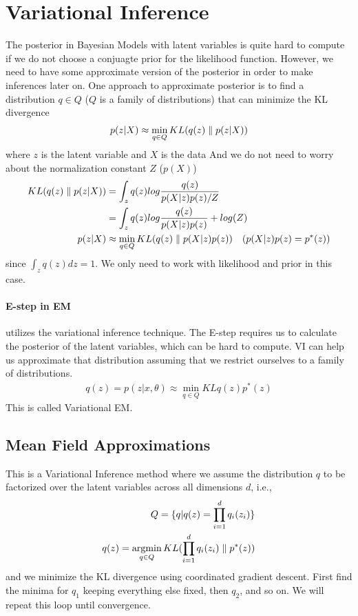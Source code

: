 \documentclass[../../statistical_learning_notes.tex]{subfiles}
\begin{document}
\section{Variational Inference}
The posterior in Bayesian Models with latent variables is quite hard to compute if we do not choose a conjuagte prior for the likelihood function. However, we need to have some approximate version of the posterior in order to make inferences later on. One approach to approximate posterior is to find a distribution $q \in Q$ ($Q$ is a family of distributions) that can minimize the KL divergence
\begin{align*}
    p(z|X) \approx \min_{q \in Q} KL(q(z) \parallel p(z|X))
\end{align*}
where $z$ is the latent variable and $X$ is the data
And we do not need to worry about the normalization constant $Z$ ($p(X)$)
\begin{align*}
    KL(q(z) \parallel p(z|X)) &= \int_{z} q(z) log\frac{q(z)}{p(X|z)p(z)/Z}\\
    &= \int_{z} q(z) log\frac{q(z)}{p(X|z)p(z)}  + log(Z)\\
    p(z|X) &\approx \min_{q \in Q} KL(q(z) \parallel p(X|z)p(z)) \quad (p(X|z)p(z) = p^{*}(z))
\end{align*}
since $\int_{z} q(z) dz = 1$. We only need to work with likelihood and prior in this case.

\paragraph{E-step in EM} utilizes the variational inference technique. The E-step requires us to calculate the posterior of the latent variables, which can be hard to compute. VI can help us approximate that distribution assuming that we restrict ourselves to a family of distributions.
\begin{align*}
    q(z) = p(z|x, \theta) \approx \min_{q \in Q}KL{q(z)}{p^{*}(z)}
\end{align*}
This is called Variational EM.


\subsection{Mean Field Approximations}
This is a Variational Inference method where we assume the distribution $q$ to be factorized over the latent variables across all dimensions $d$, i.e.,
\begin{align*}
    Q = \{q | q(z) = \prod_{i=1}^{d}q_{i}(z_{i}) \}\\
    q(z) = \operatorname*{argmin}_{q \in Q} KL(\prod_{i=1}^{d}q_{i}(z_{i}) \parallel p^{*}(z))
\end{align*}
and we minimize the KL divergence using coordinated gradient descent. First find the minima for $q_{1}$ keeping everything else fixed, then $q_{2}$, and so on. We will repeat this loop until convergence.\newline
\end{document}
